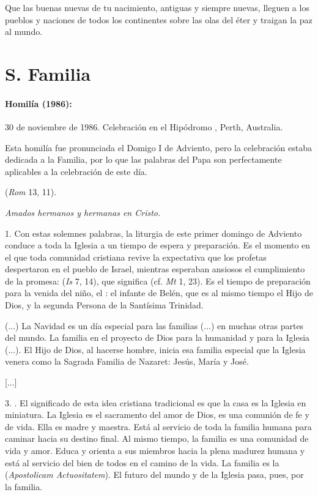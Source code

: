 \begin{body}
\begin{body}
		Que las buenas nuevas de tu nacimiento, antiguas y siempre nuevas, lleguen a los pueblos y naciones de todos los continentes sobre las olas del éter y traigan la paz al mundo.
	\end{body}
	
	
	\chapter{S. Familia}
	
	\subsubsection{Homilía (1986): } 30 de noviembre de 1986. Celebración en el Hipódromo , Perth, Australia.
	
	Esta homilía fue pronunciada el Domigo I de Adviento, pero la celebración estaba dedicada a la Familia, por lo que las palabras del Papa son perfectamente aplicables a la celebración de este día.
	
	\begin{body}
		\emph{} (\emph{Rom} 13, 11).
		
		\emph{Amados hermanos y hermanas en Cristo.}
		
		1. Con estas solemnes palabras, la liturgia de este primer domingo de Adviento conduce a toda la Iglesia a un tiempo de espera y preparación. Es el momento en el que toda comunidad cristiana revive la expectativa que los profetas despertaron en el pueblo de Israel, mientras esperaban ansiosos el cumplimiento de la promesa:  (\emph{Is} 7, 14), que significa  (cf. \emph{Mt} 1, 23). Es el tiempo de preparación para la venida del niño, el : el infante de Belén, que es al mismo tiempo el Hijo de Dios, y la segunda Persona de la Santísima Trinidad.
		
		(...) La Navidad es un día especial para las familias (...) en muchas otras partes del mundo. La familia en el proyecto de Dios para la humanidad y para la Iglesia (...). El Hijo de Dios, al hacerse hombre, inicia esa familia especial que la Iglesia venera como la Sagrada Familia de Nazaret: Jesús, María y José.
		
		{[}...{]}
		
		3. . El significado de esta idea cristiana tradicional es que la casa es la Iglesia en miniatura. La Iglesia es el sacramento del amor de Dios, es una comunión de fe y de vida. Ella es madre y maestra. Está al servicio de toda la familia humana para caminar hacia su destino final. Al mismo tiempo, la familia es una comunidad de vida y amor. Educa y orienta a sus miembros hacia la plena madurez humana y está al servicio del bien de todos en el camino de la vida. La familia es la  ({\emph{Apostolicam Actuositatem}}). El futuro del mundo y de la Iglesia pasa, pues, por la familia.
		

\end{body}
\end{body}
